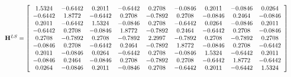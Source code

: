 \begin{equation}
\resizebox{\linewidth}{!}{
$\mathbf{H}^{LS} = \left[
\begin{array}{ccccccccc}
1.5324 & -0.6442 & 0.2011 & -0.6442 & 0.2708 & -0.0846 & 0.2011 & -0.0846 & 0.0264 \\
-0.6442 & 1.8772 & -0.6442 & 0.2708 & -0.7892 & 0.2708 & -0.0846 & 0.2464 & -0.0846 \\
0.2011 & -0.6442 & 1.5324 & -0.0846 & 0.2708 & -0.6442 & 0.0264 & -0.0846 & 0.2011 \\
-0.6442 & 0.2708 & -0.0846 & 1.8772 & -0.7892 & 0.2464 & -0.6442 & 0.2708 & -0.0846 \\
0.2708 & -0.7892 & 0.2708 & -0.7892 & 2.2997 & -0.7892 & 0.2708 & -0.7892 & 0.2708 \\
-0.0846 & 0.2708 & -0.6442 & 0.2464 & -0.7892 & 1.8772 & -0.0846 & 0.2708 & -0.6442 \\
0.2011 & -0.0846 & 0.0264 & -0.6442 & 0.2708 & -0.0846 & 1.5324 & -0.6442 & 0.2011 \\
-0.0846 & 0.2464 & -0.0846 & 0.2708 & -0.7892 & 0.2708 & -0.6442 & 1.8772 & -0.6442 \\
0.0264 & -0.0846 & 0.2011 & -0.0846 & 0.2708 & -0.6442 & 0.2011 & -0.6442 & 1.5324 \\
\end{array}
\right]\label{eq:H_LS}$}
\end{equation}
